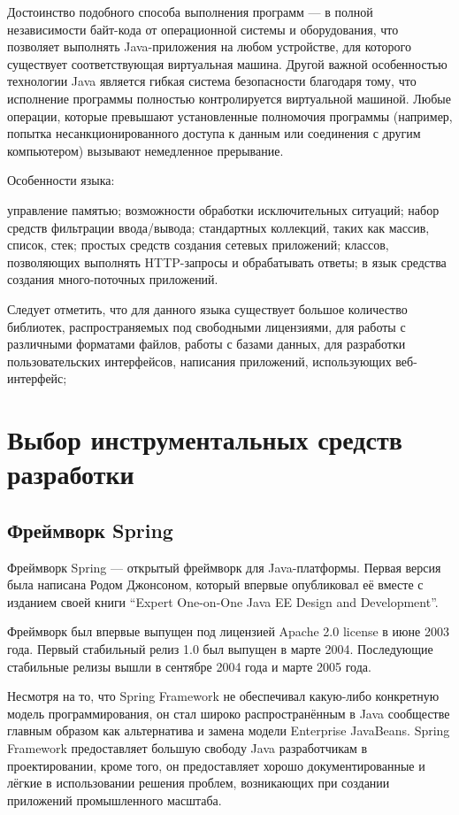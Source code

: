 \documentclass[14pt,a4paper]{reportmod}
\begin{document}
Достоинство подобного способа выполнения программ --- в полной независимости байт-кода от операционной системы и оборудования, что позволяет выполнять Java-приложения на любом устройстве, для которого существует соответствующая виртуальная машина. Другой важной особенностью технологии Java является гибкая система безопасности благодаря тому, что исполнение программы полностью контролируется виртуальной машиной. Любые операции, которые превышают установленные полномочия программы (например, попытка несанкционированного доступа к данным или соединения с другим компьютером) вызывают немедленное прерывание.


Особенности языка:
\begin{itemize}
   управление памятью;
   возможности обработки исключительных ситуаций;
   набор средств фильтрации ввода/вывода;
   стандартных коллекций, таких как массив, список, стек;
   простых средств создания сетевых приложений;
   классов, позволяющих выполнять HTTP-запросы и обрабатывать ответы;
   в язык средства создания много-поточных приложений.
\end{itemize}


Следует отметить, что для данного языка существует большое количество библиотек, распространяемых под свободными лицензиями, для работы с различными форматами файлов, работы с базами данных, для разработки пользовательских интерфейсов, написания приложений, использующих веб-интерфейс;

\section{Выбор инструментальных средств разработки}

\subsection{Фреймворк Spring}
Фреймворк Spring --- открытый фреймворк для Java-платформы. Первая версия была написана Родом Джонсоном, который впервые опубликовал её вместе с изданием своей книги ``Expert One-on-One Java EE Design and Development''.


Фреймворк был впервые выпущен под лицензией Apache 2.0 license в июне 2003 года. Первый стабильный релиз 1.0 был выпущен в марте 2004. Последующие стабильные релизы вышли в сентябре 2004 года и марте 2005 года.


Несмотря на то, что Spring Framework не обеспечивал какую-либо конкретную модель программирования, он стал широко распространённым в Java сообществе главным образом как альтернатива и замена модели Enterprise JavaBeans. Spring Framework предоставляет большую свободу Java разработчикам в проектировании, кроме того, он предоставляет хорошо документированные и лёгкие в использовании решения проблем, возникающих при создании приложений промышленного масштаба.
\end{document}
